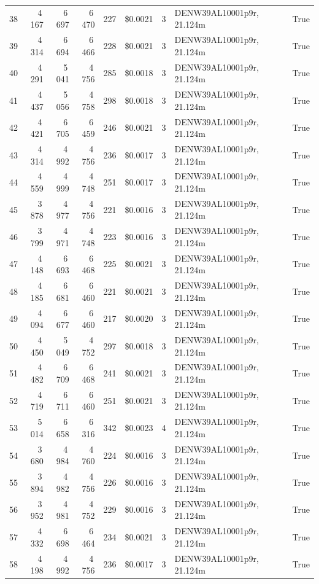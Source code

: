 \documentclass[a4paper,11pt]{article}
\begin{document}
\begin{table}[ht]
\begin{tabular}{r r r r r r r p{3cm} l}
38 & 4\,167 & 6\,697 & 6\,470 & 227 & \$0.0021 & 3 & DENW39AL10001p9r, 21.124m & True \\
39 & 4\,314 & 6\,694 & 6\,466 & 228 & \$0.0021 & 3 & DENW39AL10001p9r, 21.124m & True \\
40 & 4\,291 & 5\,041 & 4\,756 & 285 & \$0.0018 & 3 & DENW39AL10001p9r, 21.124m & True \\
41 & 4\,437 & 5\,056 & 4\,758 & 298 & \$0.0018 & 3 & DENW39AL10001p9r, 21.124m & True \\
42 & 4\,421 & 6\,705 & 6\,459 & 246 & \$0.0021 & 3 & DENW39AL10001p9r, 21.124m & True \\
43 & 4\,314 & 4\,992 & 4\,756 & 236 & \$0.0017 & 3 & DENW39AL10001p9r, 21.124m & True \\
44 & 4\,559 & 4\,999 & 4\,748 & 251 & \$0.0017 & 3 & DENW39AL10001p9r, 21.124m & True \\
45 & 3\,878 & 4\,977 & 4\,756 & 221 & \$0.0016 & 3 & DENW39AL10001p9r, 21.124m & True \\
46 & 3\,799 & 4\,971 & 4\,748 & 223 & \$0.0016 & 3 & DENW39AL10001p9r, 21.124m & True \\
47 & 4\,148 & 6\,693 & 6\,468 & 225 & \$0.0021 & 3 & DENW39AL10001p9r, 21.124m & True \\
48 & 4\,185 & 6\,681 & 6\,460 & 221 & \$0.0021 & 3 & DENW39AL10001p9r, 21.124m & True \\
49 & 4\,094 & 6\,677 & 6\,460 & 217 & \$0.0020 & 3 & DENW39AL10001p9r, 21.124m & True \\
50 & 4\,450 & 5\,049 & 4\,752 & 297 & \$0.0018 & 3 & DENW39AL10001p9r, 21.124m & True \\
51 & 4\,482 & 6\,709 & 6\,468 & 241 & \$0.0021 & 3 & DENW39AL10001p9r, 21.124m & True \\
52 & 4\,719 & 6\,711 & 6\,460 & 251 & \$0.0021 & 3 & DENW39AL10001p9r, 21.124m & True \\
53 & 5\,014 & 6\,658 & 6\,316 & 342 & \$0.0023 & 4 & DENW39AL10001p9r, 21.124m & True \\
54 & 3\,680 & 4\,984 & 4\,760 & 224 & \$0.0016 & 3 & DENW39AL10001p9r, 21.124m & True \\
55 & 3\,894 & 4\,982 & 4\,756 & 226 & \$0.0016 & 3 & DENW39AL10001p9r, 21.124m & True \\
56 & 3\,952 & 4\,981 & 4\,752 & 229 & \$0.0016 & 3 & DENW39AL10001p9r, 21.124m & True \\
57 & 4\,332 & 6\,698 & 6\,464 & 234 & \$0.0021 & 3 & DENW39AL10001p9r, 21.124m & True \\
58 & 4\,198 & 4\,992 & 4\,756 & 236 & \$0.0017 & 3 & DENW39AL10001p9r, 21.124m & True \\

\end{tabular}
\end{table}
\end{document}
